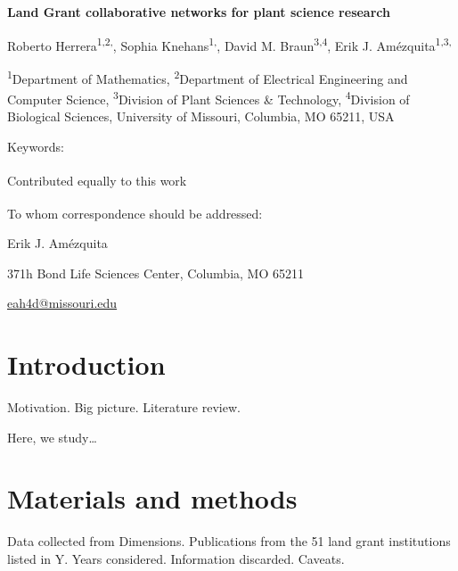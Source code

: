 \documentclass[11pt]{article}
\begin{document}
	
	{\setlength{\parindent}{0cm}
		{\Large
			\textbf{%
				Land Grant collaborative networks for plant science research
			}
		}
		
		Roberto Herrera\textsuperscript{1,2,\textdagger}, 
		Sophia Knehans\textsuperscript{1,\textdagger}, 
		David M. Braun\textsuperscript{3,4}, 
		Erik J. Am\'ezquita\textsuperscript{1,3,\textdaggerdbl}
		
		{\footnotesize
			\textsuperscript{1}Department of Mathematics, 
			\textsuperscript{2}Department of Electrical Engineering and Computer Science, 
			\textsuperscript{3}Division of Plant Sciences \& Technology,
			\textsuperscript{4}Division of Biological Sciences,
			University of Missouri, Columbia, MO 65211, USA
			
		}
		
		
		Keywords: 
		
		\vfill
		\textsuperscript{\textdagger}Contributed equally to this work
		
		\textsuperscript{\textdaggerdbl}
		To whom correspondence should be addressed:
		
		Erik J. Am\'ezquita
		\vspace{-1em}
		
		371h Bond Life Sciences Center, Columbia, MO 65211
		\vspace{-1em}
		
		\url{eah4d@missouri.edu}
	}
	\pagebreak
	
	\begin{abstract}
		Write abstract
	\end{abstract}
	
	\section{Introduction}
	
	Motivation. Big picture. Literature review. 
	
	Here, we study\ldots
	
	\section{Materials and methods}
	
	Data collected from Dimensions. Publications from the 51 land grant institutions listed in Y. Years considered. Information discarded. Caveats. \citep{Smith2018, Voo2012}
	
\end{document}
